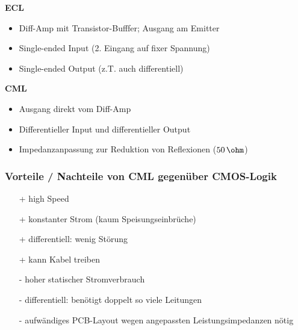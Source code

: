 \begin{minipage}[t]{0.55\columnwidth}
    \begin{center}
        \textbf{ECL}
    \end{center}

    \begin{itemize}
        \item Diff-Amp mit Transistor-Bufffer; Ausgang am Emitter 
        \item Single-ended Input (2. Eingang auf fixer Spannung)
        \item Single-ended Output (z.T. auch differentiell)
    \end{itemize}
\end{minipage}
\hfill
\begin{minipage}[t]{0.43\columnwidth}
    \begin{center}
        \textbf{CML}
    \end{center}

    \begin{itemize}
        \item Ausgang direkt vom Diff-Amp
        \item Differentieller Input und differentieller Output
        \item Impedanzanpassung zur Reduktion von Reflexionen ($50 \, \ohm$)
    \end{itemize}
\end{minipage}


\subsubsection{Vorteile / Nachteile von CML gegenüber CMOS-Logik}

\begin{minipage}[t]{0.48\columnwidth}
    \raggedcolumns
    \begin{itemize}
        \item[+] high Speed
        \item[+] konstanter Strom (kaum Speisungseinbrüche)
        \item[+] differentiell: wenig Störung
        \item[+] kann Kabel treiben 
    \end{itemize}
\end{minipage}
\hfill
\begin{minipage}[t]{0.48\columnwidth}
    \raggedcolumns
    \begin{itemize}
        \item[-] hoher statischer Stromverbrauch
        \item[-] differentiell: benötigt doppelt so viele Leitungen
        \item[-] aufwändiges PCB-Layout wegen angepassten Leistungsimpedanzen nötig 
    \end{itemize}
\end{minipage}


